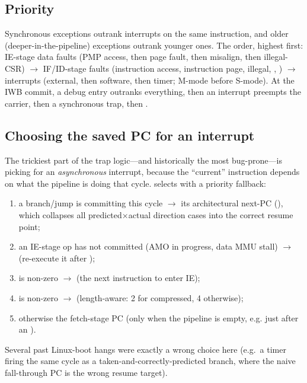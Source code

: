 
\subsection{Priority}
Synchronous exceptions outrank interrupts on the same instruction, and older
(deeper-in-the-pipeline) exceptions outrank younger ones. The order, highest
first: IE-stage data faults (PMP access, then page fault, then misalign, then
illegal-CSR) $\rightarrow$ IF/ID-stage faults (instruction access, instruction
page, illegal, , ) $\rightarrow$ interrupts (external,
then software, then timer; M-mode before S-mode). At the IWB commit, a debug
entry outranks everything, then an interrupt preempts the carrier, then a
synchronous trap, then .

\subsection{Choosing the saved PC for an interrupt}
The trickiest part of the trap logic---and historically the most bug-prone---is
picking  for an \emph{asynchronous} interrupt, because the ``current''
instruction depends on what the pipeline is doing that cycle. 
selects  with a priority fallback:
\begin{enumerate}[leftmargin=1.4em,itemsep=1pt]
\item a branch/jump is committing this cycle $\rightarrow$ its architectural
  next-PC (), which collapses all
  predicted$\times$actual direction cases into the correct resume point;
\item an IE-stage op has not committed (AMO in progress, data MMU stall)
  $\rightarrow$  (re-execute it after );
\item {} is non-zero $\rightarrow$  (the next instruction
  to enter IE);
\item {} is non-zero $\rightarrow$ 
  (length-aware: 2 for compressed, 4 otherwise);
\item otherwise the fetch-stage PC (only when the pipeline is empty, e.g.
  just after an ).
\end{enumerate}
Several past Linux-boot hangs were exactly a wrong choice here (e.g.\ a timer
firing the same cycle as a taken-and-correctly-predicted branch, where the naive
fall-through PC is the wrong resume target).

